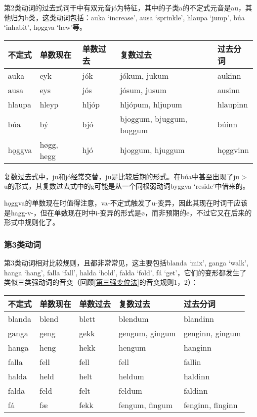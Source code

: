 第2类动词的过去式词干中有双元音jó为特征，其中的子类a的不定式元音是au，其他归为b类，这类动词包括：auka `increase', ausa `sprinkle', hlaupa `jump', búa `inhabit', hǫggva `hew‌'等。

\begin{longtable}{lllll}
    \toprule
    不定式    & 单数现在       & 单数过去  & 复数过去                     & 过去分词     \\
    \midrule
    \endhead
    \bottomrule
    \endfoot
    auka   & eyk        & jók   & jókum, jukum             & aukinn   \\
    ausa   & eys        & jós   & jósum, jusum             & ausinn   \\
    hlaupa & hleyp      & hljóp & hljópum, hljupum         & hlaupinn \\
    búa    & bý         & bjó   & bjoggum, bjuggum, buggum & búinn    \\
    hǫggva & høgg, hegg & hjó   & hjoggum, hjuggum         & hǫggvinn \\
\end{longtable}

复数过去式中，ju和jó经常交替，ju是比较后期的形式。在búa中甚至出现了ju > u的形式，其复数过去式中的g可能是从一个同根弱动词byggva
`reside'中借来的。

hǫggva的单数现在时值得注意，va-不定式触发了u-变异，因此其现在时词干应该是hagg-v-，但在单数现在时中i-变异的形式是ø，而非预期的e，不过它又在后来的形式中规则化了。

\subsubsection{第3类动词}

第3类动词相对比较规则，且都非常常见，这主要包括blanda `mix', ganga
`walk', hanga `hang', falla `fall', halda `hold', falda `fold', fá `get'，它们的变形都发生了类似三类强动词的音变（回顾\ref{第三强变位法}的音变规则1，2）：

\begin{longtable}{lllll}
    \toprule
    不定式    & 单数现在  & 单数过去  & 复数过去           & 过去分词             \\
    \midrule
    \endhead
    \bottomrule
    \endfoot
    blanda & blend & blett & blendum        & blandinn         \\
    ganga  & geng  & gekk  & gengum, gingum & genginn, gingum  \\
    hanga  & heng  & hekk  & hengum         & hanginn          \\
    falla  & fell  & fell  & fell           & fallin           \\
    halda  & held  & helt  & heldum         & haldinn          \\
    falda  & feld  & felt  & feldum         & faldinn          \\
    fá     & fæ    & fekk  & fengum, fingum & fenginn, finginn \\
\end{longtable}


